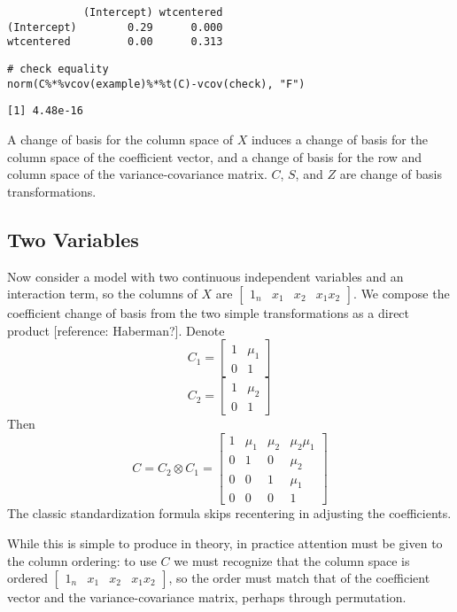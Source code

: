 \documentclass[]{article}
\begin{document}
\begin{verbatim}
            (Intercept) wtcentered
(Intercept)        0.29      0.000
wtcentered         0.00      0.313
\end{verbatim}

\begin{verbatim}
# check equality
norm(C%*%vcov(example)%*%t(C)-vcov(check), "F")
\end{verbatim}

\begin{verbatim}
[1] 4.48e-16
\end{verbatim}

A change of basis for the column space of \(X\) induces a change of
basis for the column space of the coefficient vector, and a change of
basis for the row and column space of the variance-covariance matrix.
\(C\), \(S\), and \(Z\) are change of basis transformations.

\subsection{Two Variables}\label{two-variables}

Now consider a model with two continuous independent variables and an
interaction term, so the columns of \(X\) are
\(\begin{bmatrix} 1_n &x_1 &x_2 &x_1x_2 \end{bmatrix}\). We compose the
coefficient change of basis from the two simple transformations as a
direct product {[}reference: Haberman?{]}. Denote
\[C_1=\begin{bmatrix}1 & \mu_1 \\ 0 & 1 \end{bmatrix}\]
\[C_2=\begin{bmatrix}1 & \mu_2 \\ 0 & 1 \end{bmatrix}\] Then
\[C = C_2 \otimes C_1 = \begin{bmatrix} 1 & \mu_1 &\mu_2 &\mu_2\mu_1 \\
  0 &1 &0 &\mu_2 \\ 0 &0 &1 &\mu_1 \\ 0 &0 &0 &1 \end{bmatrix}\] The
classic standardization formula skips recentering in adjusting the
coefficients.

While this is simple to produce in theory, in practice attention must be
given to the column ordering: to use \(C\) we must recognize that the
column space is ordered
\(\begin{bmatrix} 1_n &x_1 &x_2 &x_1x_2 \end{bmatrix}\), so the order
must match that of the coefficient vector and the variance-covariance
matrix, perhaps through permutation.
\end{document}
